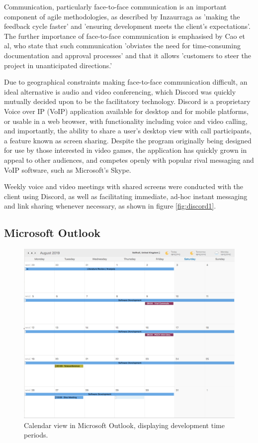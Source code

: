 Communication, particularly face-to-face communication is an important component of agile methodologies, as described by Inzaurraga as 'making the feedback cycle faster' and 'ensuring development meets the client's expectations'. \cite{Inzaurraga1} The further importance of face-to-face communication is emphasised by Cao et al, who state that such communication 'obviates the need for time-consuming documentation and approval processes' and that it allows 'customers to steer the project in unanticipated directions.' \cite{4420071}

Due to geographical constraints making face-to-face communication difficult, an ideal alternative is audio and video conferencing, which Discord was quickly mutually decided upon to be the facilitatory technology. Discord is a proprietary Voice over IP (VoIP) application available for desktop and for mobile platforms, or usable in a web browser, with functionality including voice and video calling, and importantly, the ability to share a user's desktop view with call participants, a feature known as screen sharing. \cite{Melcon1} Despite the program originally being designed for use by those interested in video games, the application has quickly grown in appeal to other audiences, and competes openly with popular rival messaging and VoIP software, such as Microsoft's Skype. \cite{Giret1}

Weekly voice and video meetings with shared screens were conducted with the client using Discord, as well as facilitating immediate, ad-hoc instant messaging and link sharing whenever necessary, as shown in figure \ref{fig:discord1}.

\subsection{Microsoft Outlook}
\begin{figure}[h]
    \includegraphics[width=\textwidth]{Figures/outlook}
    \caption{Calendar view in Microsoft Outlook, displaying development time periods.}
    \label{fig:outlook1}
\end{figure}

